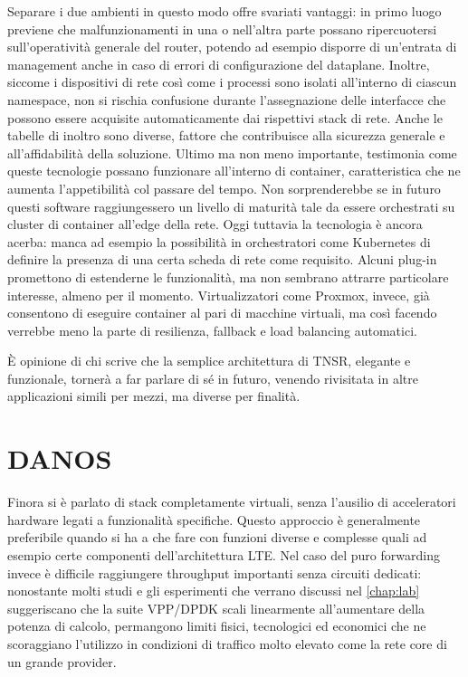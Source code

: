 Separare i due ambienti in questo modo offre svariati vantaggi: in primo luogo previene che malfunzionamenti in una o nell'altra parte possano ripercuotersi sull'operatività generale del router, potendo ad esempio disporre di un'entrata di management anche in caso di errori di configurazione del dataplane. Inoltre, siccome i dispositivi di rete così come i processi sono isolati all'interno di ciascun namespace, non si rischia confusione durante l'assegnazione delle interfacce che possono essere acquisite automaticamente dai rispettivi stack di rete. Anche le tabelle di inoltro sono diverse, fattore che contribuisce alla sicurezza generale e all'affidabilità della soluzione. Ultimo ma non meno importante, testimonia come queste tecnologie possano funzionare all'interno di container, caratteristica che ne aumenta l'appetibilità col passare del tempo. Non sorprenderebbe se in futuro questi software raggiungessero un livello di maturità tale da essere orchestrati su cluster di container all'edge della rete. Oggi tuttavia la tecnologia è ancora acerba: manca ad esempio la possibilità in orchestratori come Kubernetes di definire la presenza di una certa scheda di rete come requisito. Alcuni plug-in promettono di estenderne le funzionalità, ma non sembrano attrarre particolare interesse, almeno per il momento. Virtualizzatori come Proxmox, invece, già consentono di eseguire container al pari di macchine virtuali, ma così facendo verrebbe meno la parte di resilienza, fallback e load balancing automatici.

È opinione di chi scrive che la semplice architettura di TNSR, elegante e funzionale, tornerà a far parlare di sé in futuro, venendo rivisitata in altre applicazioni simili per mezzi, ma diverse per finalità.


\section{DANOS}

Finora si è parlato di stack completamente virtuali, senza l'ausilio di acceleratori hardware legati a funzionalità specifiche. Questo approccio è generalmente preferibile quando si ha a che fare con funzioni diverse e complesse quali ad esempio certe componenti dell'architettura LTE. Nel caso del puro forwarding invece è difficile raggiungere throughput importanti senza circuiti dedicati: nonostante molti studi e gli esperimenti che verrano discussi nel \cref{chap:lab} suggeriscano che la suite VPP/DPDK scali linearmente all'aumentare della potenza di calcolo, permangono limiti fisici, tecnologici ed economici che ne scoraggiano l'utilizzo in condizioni di traffico molto elevato come la rete core di un grande provider.

